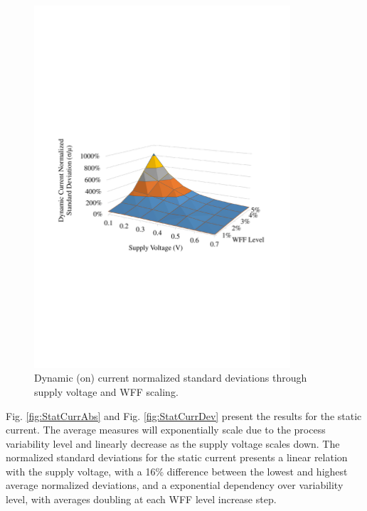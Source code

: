 \documentclass[pgmicro,diss,english]{iiufrgs}
\begin{document}
    \begin{figure}[H]
        \centering
            \includegraphics[width=0.85\textwidth, trim={1.25cm 9cm 2cm 10.5cm}, clip]{dynamicCurrDev.pdf}
            \caption{Dynamic (on) current normalized standard deviations through supply voltage and WFF scaling.}
        \label{fig:dynCurrDev}
    \end{figure}

Fig. \ref{fig:StatCurrAbs} and Fig. \ref{fig:StatCurrDev} present the results for the static current. The average measures will exponentially scale due to the process variability level and linearly decrease as the supply voltage scales down. The normalized standard deviations for the static current presents a linear relation with the supply voltage, with a 16\% difference between the lowest and highest average normalized deviations, and a exponential dependency over variability level, with averages doubling at each WFF level increase step.
\end{document}
